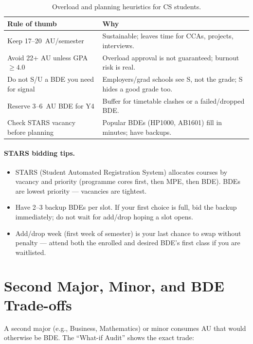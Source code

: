 \begin{table}[h]
\centering
\small
\renewcommand{\arraystretch}{1.22}
\begin{tabular}{@{}p{4.0cm} p{7.5cm}@{}}
\toprule
Rule of thumb & Why \\
\midrule
Keep 17--20~AU/semester & Sustainable; leaves time for CCAs, projects, interviews. \\
Avoid 22+ AU unless GPA $\ge 4.0$ & Overload approval is not guaranteed; burnout risk is real. \\
Do not S/U a BDE you need for signal & Employers/grad schools see S, not the grade; S hides a good grade too. \\
Reserve 3--6~AU BDE for Y4 & Buffer for timetable clashes or a failed/dropped BDE. \\
Check STARS vacancy before planning & Popular BDEs (HP1000, AB1601) fill in minutes; have backups. \\
\bottomrule
\end{tabular}
\caption{Overload and planning heuristics for CS students.}
\label{tab:overload-heuristics}
\end{table}

\paragraph{STARS bidding tips.}
\begin{itemize}
    \item STARS (Student Automated Registration System) allocates courses by vacancy and priority (programme cores first, then MPE, then BDE). BDEs are lowest priority --- vacancies are tightest.
    \item Have 2--3 backup BDEs per slot. If your first choice is full, bid the backup immediately; do not wait for add/drop hoping a slot opens.
    \item Add/drop week (first week of semester) is your last chance to swap without penalty --- attend both the enrolled and desired BDE's first class if you are waitlisted.
\end{itemize}

\section{Second Major, Minor, and BDE Trade-offs}
\label{sec:second-major-trade}

A second major (e.g., Business, Mathematics) or minor consumes AU that would otherwise be BDE. The ``What-if Audit'' shows the exact trade:

